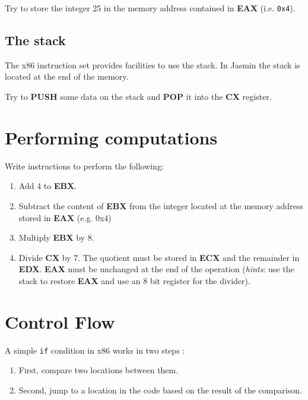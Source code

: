 \documentclass[a4paper]{article}
\newenvironment{instruction}%
{\vspace{15pt}
	\begin{Sbox}
		\begin{minipage}{\textwidth}}%
		{\end{minipage}
	\end{Sbox}	
\shadowbox{\TheSbox} \vspace{10pt}}
\newcommand{\asmop}[1]{{\sffamily \bfseries \color{asmblue} #1}}
\newcommand{\asmreg}[1]{{\sffamily \bfseries \color{asmgreen} #1}}
\begin{document}
\begin{instruction}
	Try to store the integer 25 in the memory address contained in \asmreg{EAX} (i.e. \texttt{0x4}).
\end{instruction}


\subsection{The stack}

The x86 instruction set provides facilities to use the stack. In \textsf{Jasmin} the stack is located at the end of the memory. 

\begin{instruction}
	Try to \asmop{PUSH} some data on the stack and \asmop{POP} it into the \asmreg{CX} register.
\end{instruction}


\section{Performing computations}


\begin{instruction}
	Write instructions to perform the following:
	\begin{enumerate}
		\item Add 4 to \asmreg{EBX}.
		\item Subtract the content of \asmreg{EBX} from the integer located at the memory address stored in \asmreg{EAX} (e.g. 0x4)
		\item Multiply \asmreg{EBX} by 8.
		\item Divide \asmreg{CX} by 7. The quotient must be stored in \asmreg{ECX} and the remainder in \asmreg{EDX}.
		\asmreg{EAX} must be unchanged at the end of the operation 
		(\emph{hints}: use the stack to restore \asmreg{EAX} and use an 8 bit register for the divider).
	\end{enumerate}
\end{instruction}


\section{Control Flow}

A simple \texttt{if} condition in x86 works in two steps : 
\begin{enumerate}
	\item First, compare two locations between them.
	\item Second, jump to a location in the code based on the result of the comparison.
\end{enumerate}
\end{document}
